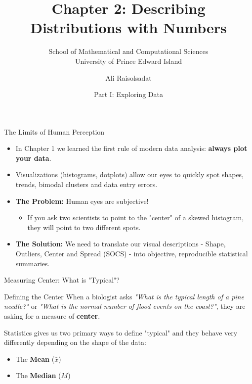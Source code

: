 \documentclass[aspectratio=169]{beamer}
\title[Chapter 2: Numerical Summaries]{\textbf{Chapter 2: Describing Distributions with Numbers}}
\subtitle{School of Mathematical and Computational Sciences \\ University of Prince Edward Island}
\author{Ali Raisolsadat}
\date{Part I: Exploring Data}
\begin{document}

\begin{frame}
 \titlepage
\end{frame}


\begin{frame}{The Limits of Human Perception}
\begin{itemize}
	\item In Chapter 1 we learned the first rule of modern data analysis: \textbf{always plot your data}.
	\item Visualizations (histograms, dotplots) allow our eyes to quickly spot shapes, trends, bimodal clusters and data entry errors.
	\item \textbf{The Problem:} Human eyes are subjective! 
	\begin{itemize}
		\item If you ask two scientists to point to the "center" of a skewed histogram, they will point to two different spots.
	\end{itemize}
	\item \textbf{The Solution:} We need to translate our visual descriptions - Shape, Outliers, Center and Spread (SOCS) - into objective, reproducible statistical summaries.
\end{itemize}
\end{frame}



\begin{frame}{Measuring Center: What is "Typical"?}
 \begin{block}{Defining the Center}
When a biologist asks \emph{"What is the typical length of a pine needle?"} or \emph{"What is the normal number of flood events on the coast?"}, they are asking for a measure of \textbf{center}.
\end{block}

\vspace{0.3cm}

Statistics gives us two primary ways to define "typical" and they behave very differently depending on the shape of the data:

\begin{itemize}
	\item The \textbf{Mean} ($\bar{x}$)
	\item The \textbf{Median} ($M$)
\end{itemize}
\end{frame}
\end{document}
